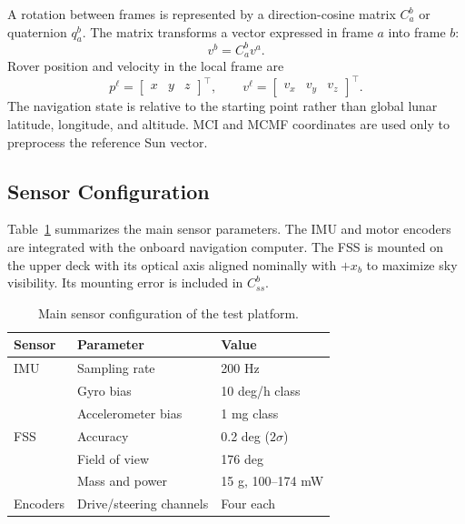 \documentclass[]{IAC_style}
\begin{document}
A rotation between frames is represented by a direction-cosine matrix $C_a^b$ or quaternion $q_a^b$. The matrix transforms a vector expressed in frame $a$ into frame $b$:
\begin{equation*}
v^b=C_a^b v^a.
\end{equation*}
Rover position and velocity in the local frame are
\begin{equation*}
p^\ell=\begin{bmatrix}x&y&z\end{bmatrix}^{\top},\qquad v^\ell=\begin{bmatrix}v_x&v_y&v_z\end{bmatrix}^{\top}.
\end{equation*}
The navigation state is relative to the starting point rather than global lunar latitude, longitude, and altitude. MCI and MCMF coordinates are used only to preprocess the reference Sun vector.

\subsection{Sensor Configuration}

Table~\ref{tab:sensors} summarizes the main sensor parameters. The IMU and motor encoders are integrated with the onboard navigation computer. The FSS is mounted on the upper deck with its optical axis aligned nominally with $+x_b$ to maximize sky visibility. Its mounting error is included in $C_{ss}^b$.

\begin{table}[t]
\centering
\caption{Main sensor configuration of the test platform.}
\label{tab:sensors}
\scriptsize
\begin{tabularx}{\columnwidth}{p{}p{}X}
\toprule
\textbf{Sensor} & \textbf{Parameter} & \textbf{Value} \\
\midrule
IMU & Sampling rate & 200 Hz \\
 & Gyro bias & 10 deg/h class \\
 & Accelerometer bias & 1 mg class \\
FSS & Accuracy & 0.2 deg ($2\sigma$) \\
 & Field of view & 176 deg \\
 & Mass and power & 15 g, 100--174 mW \\
Encoders & Drive/steering channels & Four each \\
\bottomrule
\end{tabularx}
\end{table}
\end{document}
